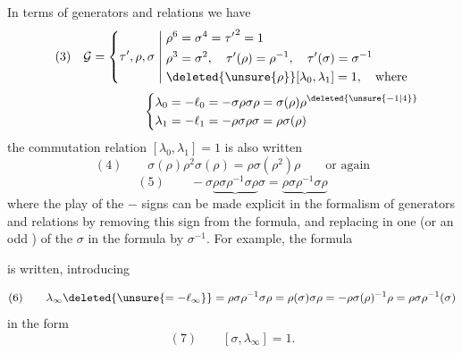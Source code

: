 In terms of generators and relations we have
\[
(3)\quad\mathcal{G}=\left\{\tau',\rho,\sigma\;\middle|\;
\begin{aligned}
&\rho^6=\sigma^4={\tau'}^2=1\\
&\rho^3=\sigma^2,\quad\tau'(\rho)=\rho^{-1},\quad\tau'(\sigma)=\sigma^{-1}\\
&\deleted{\unsure{\rho}}[\lambda_0,\lambda_1]=1,\quad\text{where}
\end{aligned}\right.
\]
\[
\hspace{8em}\left\{
\begin{aligned}
\lambda_0&=-\ell_0=-\sigma\rho\sigma\rho=\sigma(\rho)\rho^{\deleted{\unsure{-1|4}}}\\
\lambda_1&=-\ell_1=-\rho\sigma\rho\sigma=\rho\sigma(\rho)
\end{aligned}\right.
\]
 the commutation relation $[\lambda_0,\lambda_1]=1$ is also written
\[
(4)\qquad \sigma(\rho)\rho^2\sigma(\rho)=\rho\sigma(\rho^2)\rho
\qquad\text{or again}
\]
\[
(5)\qquad -\sigma\underbrace{\rho\sigma\rho^{-1}\sigma\rho}\sigma
=\underbrace{\rho\sigma\rho^{-1}\sigma\rho}
\]
where the play of the $-$ signs can be made explicit in the formalism of generators and relations by removing this sign from the formula, and replacing in  one (or an odd ) of the $\sigma$ in the formula by $\sigma^{-1}$. For example, the formula



is written, introducing


\[
(6)\qquad
\lambda_\infty\deleted{\unsure{=-\ell_\infty}}
=\rho\sigma\rho^{-1}\sigma\rho
=\rho(\sigma)\sigma\rho
=-\rho\sigma(\rho)^{-1}\rho
=\rho\sigma\rho^{-1}(\sigma)
\]
in the form
\[
(7)\qquad [\sigma,\lambda_\infty]=1.
\]



